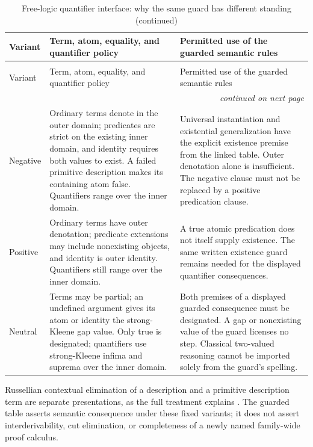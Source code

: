 \begingroup\small
\begin{longtable}{@{}p{.15\linewidth}p{.39\linewidth}p{.38\linewidth}@{}}
\caption{Free-logic quantifier interface: why the same guard has different standing.}
\label{tab:p14-nonclassical-free-guards}\\
\toprule
Variant & Term, atom, equality, and quantifier policy & Permitted use of the guarded semantic rules \\
\midrule\endfirsthead
\caption[]{Free-logic quantifier interface: why the same guard has different standing (continued)}\\
\toprule Variant & Term, atom, equality, and quantifier policy & Permitted use of the guarded semantic rules \\
\midrule\endhead
\midrule\multicolumn{3}{r}{\emph{continued on next page}}\\
\endfoot
\endlastfoot
Negative & Ordinary terms denote in the outer domain; predicates are
strict on the existing inner domain, and identity requires both values to
exist. A failed primitive description makes its containing atom false.
Quantifiers range over the inner domain. & Universal instantiation and
existential generalization have the explicit existence premise from the
linked table. Outer denotation alone is insufficient. The negative clause
must not be replaced by a positive predication clause. \\
\addlinespace
Positive & Ordinary terms have outer denotation; predicate extensions may
include nonexisting objects, and identity is outer identity. Quantifiers
still range over the inner domain. & A true atomic predication does not
itself supply existence. The same written existence guard remains needed
for the displayed quantifier consequences. \\
\addlinespace
Neutral & Terms may be partial; an undefined argument gives its atom or
identity the strong-Kleene gap value. Only true is designated; quantifiers
use strong-Kleene infima and suprema over the inner domain. & Both
premises of a displayed guarded consequence must be designated. A gap or
nonexisting value of the guard licenses no step. Classical two-valued
reasoning cannot be imported solely from the guard's spelling. \\
\bottomrule
\end{longtable}\endgroup

Russellian contextual elimination of a description and a primitive
description term are separate presentations, as the full treatment explains
\cite{Russell1905,Lambert1967,Bencivenga1986,Lehmann2002}.  The guarded
table asserts semantic consequence under these fixed variants; it does not
assert interderivability, cut elimination, or completeness of a newly named
family-wide proof calculus.

